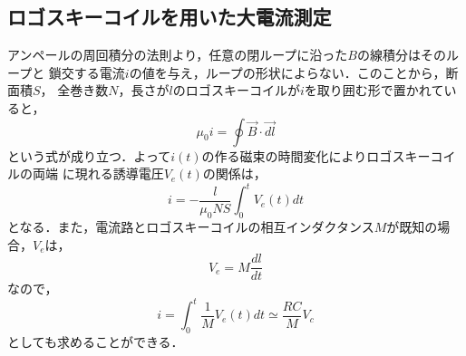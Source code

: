 \subsection{ロゴスキーコイルを用いた大電流測定}
アンペールの周回積分の法則より，任意の閉ループに沿った$B$の線積分はそのループと
鎖交する電流$i$の値を与え，ループの形状によらない．このことから，断面積$S$，
全巻き数$N$，長さが$l$のロゴスキーコイルが$i$を取り囲む形で置かれていると，
$$
\mu_0 i = \oint \vec{B} \cdot \vec{dl}
$$
という式が成り立つ．よって$i(t)$の作る磁束の時間変化によりロゴスキーコイルの両端
に現れる誘導電圧$V_e(t)$の関係は，
$$
i=-\frac{l}{\mu_0 NS}\int_{0}^{t} V_e(t)dt
$$
となる．また，電流路とロゴスキーコイルの相互インダクタンス$M$が既知の場合，$V_e$は，
$$
V_e=M\frac{dl}{dt}
$$
なので，
$$
i=\int_{0}^{t}\frac{1}{M}V_e(t)dt \simeq \frac{RC}{M}V_c
$$
としても求めることができる．